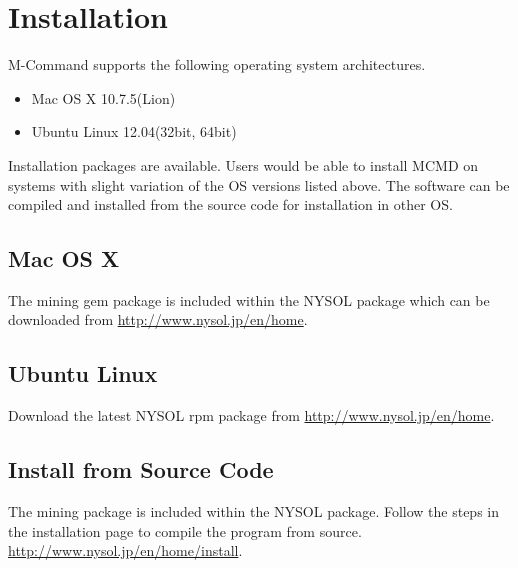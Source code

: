 %

\section{Installation\label{sect:install}}

M-Command supports the following operating system architectures. 
\begin{itemize}
\item Mac OS X 10.7.5(Lion)
\item Ubuntu Linux 12.04(32bit, 64bit)
\end{itemize}

Installation packages are available. 
Users would be able to install MCMD on systems with slight variation of the OS versions listed above. 
The software can be compiled and installed from the source code for installation in other OS. 

\subsection{Mac OS X\label{sect:install_osx}}
The mining gem package is included within the NYSOL package which can be downloaded from 
\url{http://www.nysol.jp/en/home}. 

\subsection{Ubuntu Linux\label{sect:install_ubuntu}}
Download the latest NYSOL rpm package from 
\url{http://www.nysol.jp/en/home}. 

\subsection{Install from Source Code
\label{sect:install_source}}

The mining package is included within the NYSOL package. Follow the steps in the installation page to  compile the program from source. 
\url{http://www.nysol.jp/en/home/install}.

%
